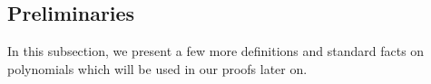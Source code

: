 \documentclass[11pt]{article}
\newcommand{\Boo}{\{0,1 \}}
\newcommand{\bigO}{\mathcal{O}}
\newcommand{\F}{\mathbb{F}}
\newcommand{\comment}[2]{\marginpar{\tiny{\textbf{#1: }\textit{#2}}}}
\newcommand{\nl}[1]{\comment{NL}{#1}}
\newcommand{\IPSLIN}{\mathrm{IPS}_{\mathrm{LIN}}}
\newcommand{\ml}{\mathsf{ml}}
\begin{document}





\subsection{Preliminaries}
In this subsection, we present a few more definitions and standard facts on polynomials which will be used in our proofs later on.\\
\end{document}
